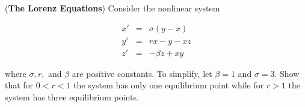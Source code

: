 \documentclass[11pt,letterpaper,boxed]{pset}
\begin{document}
    \begin{problem} [Exercise 6.]
        ({\bf The Lorenz Equations}) Consider the  nonlinear system
        
        \begin{eqnarray*}
            x' & = & \sigma ( y - x) \\
            y' & = & r x - y - x z \\
            z'  & = & -\beta z + x y
        \end{eqnarray*}
        
        where $\sigma,  r,$ and $\beta$ are positive constants. To simplify, let $\beta=1$ and $\sigma=3$. Show that for $0 < r < 1$ the system has only one equilibrium point while for $r>1$ the system has three equilibrium points. 
    \end{problem}
    \newpage
\end{document}
